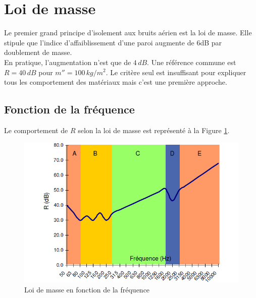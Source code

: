 \documentclass[11pt]{report}
\begin{document}
\section{Loi de masse}
Le premier grand principe d'isolement aux bruits aérien est la loi de masse. Elle stipule que l'indice d'affaiblissement d'une paroi augmente de 6dB par doublement de masse.\\

En pratique, l'augmentation n'est que de $4\,dB$. Une référence commune est $R=40\,dB$ pour $m''=100\,kg/m^2$. Le critère seul est insuffisant pour expliquer tous les comportement des matériaux mais c'est une première approche.

\subsection{Fonction de la fréquence}
Le comportement de $R$ selon la loi de masse est représenté à la Figure \ref{f1}.
\begin{figure}[ht]
\centering
\includegraphics[width=0.8\linewidth]{f1}
\caption{Loi de masse en fonction de la fréquence}
\label{f1}
\end{figure}
\end{document}
